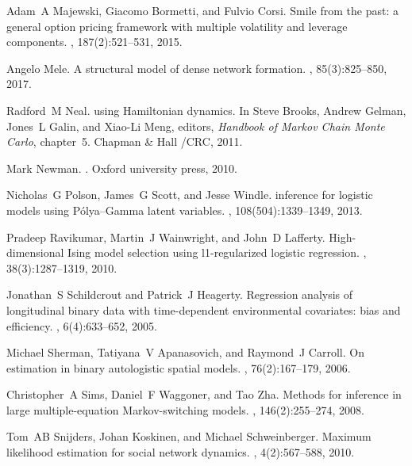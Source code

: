 \documentclass[12pt,a4paper]{article}
\theoremstyle{custom}
\begin{document}
\begin{thebibliography}{10}
Adam~A Majewski, Giacomo Bormetti, and Fulvio Corsi.
\newblock Smile from the past: a general option pricing framework with multiple
  volatility and leverage components.
, 187(2):521--531, 2015.

Angelo Mele.
\newblock A structural model of dense network formation.
, 85(3):825--850, 2017.

Radford~M Neal.
 using {Hamiltonian} dynamics.
\newblock In Steve Brooks, Andrew Gelman, Jones~L Galin, and Xiao-Li Meng,
  editors, {\em Handbook of {Markov Chain Monte Carlo}}, chapter~5. Chapman \&
  Hall /{CRC}, 2011.

Mark Newman.
.
\newblock Oxford university press, 2010.

Nicholas~G Polson, James~G Scott, and Jesse Windle.
 inference for logistic models using {P{\'o}lya--Gamma}
  latent variables.
,
  108(504):1339--1349, 2013.

Pradeep Ravikumar, Martin~J Wainwright, and John~D Lafferty.
\newblock High-dimensional {Ising} model selection using l1-regularized
  logistic regression.
, 38(3):1287--1319, 2010.

Jonathan~S Schildcrout and Patrick~J Heagerty.
\newblock Regression analysis of longitudinal binary data with time-dependent
  environmental covariates: bias and efficiency.
, 6(4):633--652, 2005.

Michael Sherman, Tatiyana~V Apanasovich, and Raymond~J Carroll.
\newblock On estimation in binary autologistic spatial models.
,
  76(2):167--179, 2006.

Christopher~A Sims, Daniel~F Waggoner, and Tao Zha.
\newblock Methods for inference in large multiple-equation {M}arkov-switching
  models.
, 146(2):255--274, 2008.

Tom~AB Snijders, Johan Koskinen, and Michael Schweinberger.
\newblock Maximum likelihood estimation for social network dynamics.
, 4(2):567--588, 2010.


\end{thebibliography}
\end{document}
